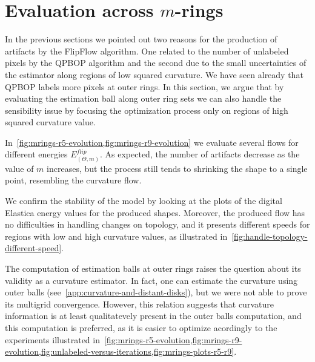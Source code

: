 {\section{Evaluation across $m$-rings}
\label{ch7:sec:evaluation-across-rings}

In the previous sections we pointed out two reasons for the production of artifacts by the FlipFlow algorithm. One related to the number of unlabeled pixels by the QPBOP algorithm and the second due to the small uncertainties of the estimator along regions of low squared curvature. We have seen already that QPBOP labels more pixels at outer rings. In this section, we argue that by evaluating the estimation ball along outer
ring sets we can also handle the sensibility issue by focusing the optimization process only on regions of high squared curvature value.

In~\cref{fig:mrings-r5-evolution,fig:mrings-r9-evolution} we evaluate several flows for different energies $E_{(\Theta,m)}^{flip}$. As expected, the number of artifacts decrease as the value of $m$ increases, but the process still tends to shrinking the shape to a single point, resembling the curvature flow. 

We confirm the stability of the model by looking at the plots of the digital Elastica energy values for the produced shapes. Moreover, the produced flow has no difficulties in handling changes on topology, and it presents different speeds for regions with low and high curvature values, as illustrated in~\cref{fig:handle-topology-different-speed}.

The computation of estimation balls at outer rings raises the question about its validity as a curvature estimator. In fact, one can estimate the curvature using outer balls (see~\cref{app:curvature-and-distant-disks}), but we were not able to prove its multigrid convergence. However, this relation suggests that curvature information is at least qualitatevely present in the outer balls computation, and this computation is preferred, as it is easier to optimize acordingly to the experiments illustrated in~\cref{fig:mrings-r5-evolution,fig:mrings-r9-evolution,fig:unlabeled-versus-iterations,fig:mrings-plots-r5-r9}.

}

